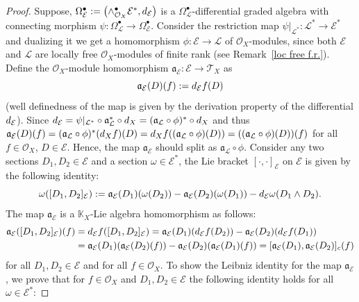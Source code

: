 \documentclass[10pt,a4paper]{amsart}
\begin{document}
\begin{proof}
Suppose, $\Omega^{\bullet}_{\mathcal{E}}:=\bigl(\wedge^{\bullet}_{\mathcal{O}_X}\mathcal{E}^*,{\rm d}_{\mathcal{E}}\bigr)$ is a $\Omega^{\bullet}_{\mathcal{L}}$-differential graded algebra with connecting morphism $\psi\colon \Omega^{\bullet}_{\mathcal{L}} \rightarrow \Omega^{\bullet}_{\mathcal{E}}$.
	Consider the restriction map $ \psi|_{\mathcal{L}^*}\colon \mathcal{L}^* \rightarrow \mathcal{E}^*$ and dualizing it we get a homomorphism $\phi\colon \mathcal{E}\rightarrow \mathcal{L}$ of $\mathcal{O}_X$-modules, since both $\mathcal{E}$ and $\mathcal{L}$ are locally free $\mathcal{O}_X$-modules of finite rank (see Remark~\ref{loc free f.r.}).
	Define the $\mathcal{O}_X$-module homomorphism
	$\mathfrak{a}_{\mathcal{E}}\colon \mathcal{E}\rightarrow \mathcal{T}_X$ as
\[
\mathfrak{a}_{\mathcal{E}}(D)(f):={\rm d}_{\mathcal{E}}f (D)
\]
	(well definedness of the map is given by the derivation property of the differential ${\rm d}_{\mathcal{E}}$).
	Since ${\rm d}_{\mathcal{E}}=\psi|_{\mathcal{L}^*} \circ \mathfrak{a}_{\mathcal{L}}^* \circ {\rm d}_X= (\mathfrak{a}_{\mathcal{L}}\circ \phi)^* \circ {\rm d}_X$ and thus $\mathfrak{a}_{\mathcal{E}}(D)(f)= (\mathfrak{a}_{\mathcal{L}}\circ \phi)^* ({\rm d}_Xf)(D)={\rm d}_Xf((\mathfrak{a}_{\mathcal{L}}\circ \phi)(D))=((\mathfrak{a}_{\mathcal{L}}\circ \phi)(D))(f)$ for all $f \in \mathcal{O}_X$, $D\in \mathcal{E}$. Hence, the map
	$\mathfrak{a}_{\mathcal{E}}$ should split as $\mathfrak{a}_{\mathcal{L}}\circ \phi$.
	Consider any two sections $D_1, D_2 \in \mathcal{E}$ and a section $\omega \in \mathcal{E}^*$, the Lie bracket $[\cdot,\cdot]_{\mathcal{E}}$ on $\mathcal{E}$ is given by the following identity:
\[
\omega([D_1, D_2]_{\mathcal{E}}):= \mathfrak{a}_{\mathcal{E}}(D_1)(\omega(D_2))- \mathfrak{a}_{\mathcal{E}}(D_2)(\omega(D_1))- {\rm d}_{\mathcal{E}}\omega (D_1 \wedge D_2).
\]
	The map $\mathfrak{a}_{\mathcal{E}}$ is a $\mathbb{K}_X$-Lie algebra homomorphism as follows:
\begin{align*}
\mathfrak{a}_{\mathcal{E}}([D_1,D_2]_{\mathcal{E}})(f)&={\rm d}_{\mathcal{E}}f([D_1,D_2]_{\mathcal{E}}) =\mathfrak{a}_{\mathcal{E}}(D_1)({\rm d}_{\mathcal{E}}f(D_2))-\mathfrak{a}_{\mathcal{E}}(D_2)({\rm d}_{\mathcal{E}}f(D_1))\\
& =\mathfrak{a}_{\mathcal{E}}(D_1)(\mathfrak{a}_{\mathcal{E}}(D_2)(f)) -\mathfrak{a}_{\mathcal{E}}(D_2)(\mathfrak{a}_{\mathcal{E}}(D_1)(f)) =[\mathfrak{a}_{\mathcal{E}}(D_1),\mathfrak{a}_{\mathcal{E}}(D_2)]_c(f)
\end{align*}
	for all $D_1,D_2 \in \mathcal{E}$ and for all $f \in \mathcal{O}_X$.
	To show the Leibniz identity for the map $\mathfrak{a}_{\mathcal{E}}$, we prove that for $f \in \mathcal{O}_X$ and $D_1,D_2 \in \mathcal{E}$ the following identity holds for all $\omega \in \mathcal{E}^*$:

\end{proof}
\end{document}
